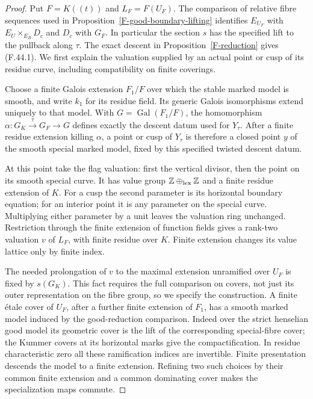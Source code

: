 \documentclass[11pt,oneside]{article}
\begin{document}
\begin{proof}
Put $F=K((t))$ and $L_F=F(U_F)$. The comparison of relative
fibre sequences used in Proposition~\ref{F-good-boundary-lifting}
identifies $E_{U_F}$ with $E_U\times_{E_B}D_c$ and
$D_c$ with $G_F$. In particular the section $s$ has the
specified lift to the pullback along $\tau$. The exact
descent in Proposition~\ref{F-reduction} gives (F.44.1).
We first explain the valuation supplied by an actual
point or cusp of its residue curve, including compatibility
on finite coverings.

Choose a finite Galois extension $F_1/F$ over which the
stable marked model is smooth, and write $k_1$ for its
residue field. Its generic Galois isomorphisms extend
uniquely to that model. With $G=\operatorname{Gal}(F_1/F)$,
the homomorphism $\alpha:G_K\xrightarrow{\tau}G_F\to G$
defines exactly the descent datum used for $Y_\tau$.
After a finite residue extension killing $\alpha$, a
point or cusp of $Y_\tau$ is therefore a closed point
$y$ of the smooth special marked model, fixed by this
specified twisted descent datum.

At this point take the flag valuation: first the vertical
divisor, then the point on its smooth special curve.
It has value group $\mathbb Z\oplus_{\rm lex}\mathbb Z$
and a finite residue extension of $K$. For a cusp the
second parameter is its horizontal boundary equation;
for an interior point it is any parameter on the special
curve. Multiplying either parameter by a unit leaves
the valuation ring unchanged. Restriction through the
finite extension of function fields gives a rank-two
valuation $v$ of $L_F$, with finite residue over $K$.
Finite extension changes its value lattice only by finite
index.

The needed prolongation of $v$ to the maximal extension
unramified over $U_F$ is fixed by $s(G_K)$. This fact
requires the full comparison on covers, not just its
outer representation on the fibre group, so we specify
the construction. A finite \'etale cover of $U_F$,
after a further finite extension of $F_1$, has a smooth
marked model induced by the good-reduction comparison.
Indeed over the strict henselian good model its geometric
cover is the lift of the corresponding special-fibre
cover; the Kummer covers at its horizontal marks give
the compactification. In residue characteristic zero
all these ramification indices are invertible. Finite
presentation descends the model to a finite extension.
Refining two such choices by their common finite
extension and a common dominating cover makes the
specialization maps commute.


\end{proof}
\end{document}
